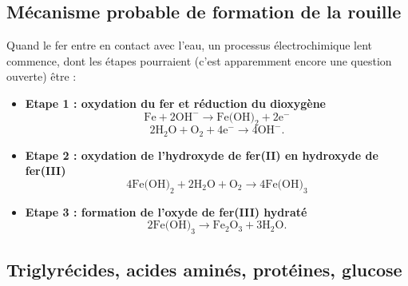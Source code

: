 \documentclass[11pt,a4paper]{report}
\begin{document}
\subsection*{Mécanisme probable de formation de la rouille}

Quand le fer entre en contact avec l'eau, un processus électrochimique lent commence, dont les étapes pourraient (c'est apparemment encore une question ouverte) être :\\
\begin{itemize}
	\item \textbf{Etape 1 : oxydation du fer et réduction du dioxygène}
	\begin{equation}
		\text{Fe} + 2\text{OH}^- \rightarrow \text{Fe(OH)}_2 + 2\text{e}^-
	\end{equation}
	\begin{equation}
		2\text{H}_2\text{O} + \text{O}_2 + 4 \text{e}^- \rightarrow 4\text{OH}^-. 
	\end{equation}
	
	\item \textbf{Etape 2 : oxydation de l'hydroxyde de fer(II) en hydroxyde de fer(III)}
	\begin{equation}
		4\text{Fe(OH)}_2 + 2\text{H}_2\text{O} + \text{O}_2\rightarrow 4\text{Fe(OH)}_3 
	\end{equation}	 
	\item \textbf{Etape 3 : formation de l'oxyde de fer(III) hydraté}
	\begin{equation}
		2\text{Fe(OH)}_3 \rightarrow \text{Fe}_2\text{O}_3 + 3\text{H}_2\text{O}.
	\end{equation}
\end{itemize}

\newpage
\subsection*{Triglyrécides, acides aminés, protéines, glucose}
\end{document}
